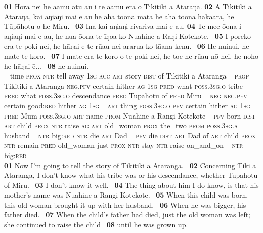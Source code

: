 {\bigskip\gll
\textbf{\textup{01}} Hora nei he {\ꞌ}a{\ꞌ}amu atu au i te {\ꞌ}a{\ꞌ}amu era o Tikitiki {\ꞌ}a {\ꞌ}Ataraŋa. \textbf{\textup{02}} A Tikitiki {\ꞌ}a {\ꞌ}Ataraŋa, kai aŋiaŋi mai e au he aha tō{\ꞌ}ona mata he aha tō{\ꞌ}ona hakaara, he Tūpāhotu {\ꞌ}o he Miru. ~\textbf{\textup{03}} {\ꞌ}Ina kai aŋiaŋi rivariva mai e au. \textbf{\textup{04}} Te me{\ꞌ}e ō{\ꞌ}ona i aŋiaŋi mai e au, he nua ō{\ꞌ}ona te {\ꞌ}īŋoa ko Nuahine {\ꞌ}a Raŋi Kotekote. ~\textbf{\textup{05}} I poreko era te poki nei, he hāŋai e te rū{\ꞌ}au nei ararua ko tā{\ꞌ}ana kenu. ~\textbf{\textup{06}} He nuinui, he mate te koro. ~\textbf{\textup{07}} I mate era te koro o te poki nei, he toe he rū{\ꞌ}au nō nei, he noho he hāŋai ē... ~\textbf{\textup{08}} he nuinui.\\
~ time \textsc{prox} \textsc{ntr} tell away \textsc{1sg} \textsc{acc} \textsc{art} story \textsc{dist} of Tikitiki a Ataranga  ~ \textsc{prop} Tikitiki a Ataranga \textsc{neg.pfv} certain hither \textsc{ag} \textsc{1sg} \textsc{pred} what \textsc{poss.3sg.o} tribe \textsc{pred} what \textsc{poss.3sg.o} descendance \textsc{pred} Tupahotu of \textsc{pred} Miru ~ \textsc{neg} \textsc{neg.pfv} certain good:\textsc{red} hither \textsc{ag} \textsc{1sg} ~ \textsc{art} thing \textsc{poss.3sg.o} \textsc{pfv} certain hither \textsc{ag} \textsc{1sg} \textsc{pred} Mum \textsc{poss.3sg.o} \textsc{art} name \textsc{prom} Nuahine a Rangi Kotekote ~ \textsc{pfv} born \textsc{dist} \textsc{art} child \textsc{prox} \textsc{ntr} raise \textsc{ag} \textsc{art} old\_woman \textsc{prox} the\_two \textsc{prom} \textsc{poss.3sg.a} husband ~ \textsc{ntr} big:\textsc{red} \textsc{ntr} die \textsc{art} Dad ~ \textsc{pfv} die \textsc{dist} \textsc{art} Dad of \textsc{art} child \textsc{prox} \textsc{ntr} remain \textsc{pred} old\_woman just \textsc{prox} \textsc{ntr} stay \textsc{ntr} raise on\_and\_on ~ \textsc{ntr} big:\textsc{red}\\

\medskip\glt
\textbf{\textup{01}} Now I’m going to tell the story of Tikitiki a Ataranga. ~\textbf{\textup{02}} Concerning Tiki a Ataranga, I don’t know what his tribe was or his descendance, whether Tupahotu of Miru. ~\textbf{\textup{03}} I don’t know it well. ~\textbf{\textup{04}} The thing about him I do know, is that his mother’s name was Nuahine a Rangi Kotekote. ~\textbf{\textup{05}} When this child was born, this old woman brought it up with her husband. ~\textbf{\textup{06}} When he was bigger, his father died. ~\textbf{\textup{07}} When the child’s father had died, just the old woman was left; she continued to raise the child ~\textbf{\textup{08}} until he was grown up.


}
